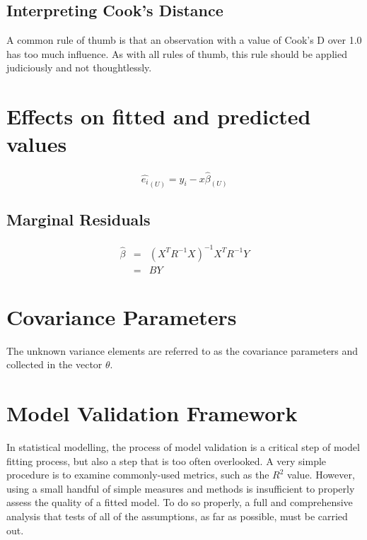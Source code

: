 \documentclass[12pt, a4paper]{article}
\begin{document}
			
			
			

			

			\subsection{Interpreting Cook's Distance}
			A common rule of thumb is that an observation with a value of Cook's D over 1.0 has too much influence. As with all rules of thumb, this rule should be applied judiciously and not thoughtlessly.



			
			
			

			\section{Effects on fitted and predicted values}
			\begin{equation}
			\hat{e_{i}}_{(U)} = y_{i} - x\hat{\beta}_{(U)}
			\end{equation}
			

			
			\subsection{Marginal Residuals}
			\begin{eqnarray}
			\hat{\beta} &=& (X^{T}R^{-1}X)^{-1}X^{T}R^{-1}Y \nonumber \\
			&=& BY \nonumber
			\end{eqnarray}
			
			
			\section{Covariance Parameters} %
			The unknown variance elements are referred to as the covariance parameters and collected in the vector $\theta$.
			

			
			
			\section{Model Validation Framework}
			In statistical modelling, the process of model validation is a critical step of model fitting process, but also a step that is too often overlooked. A very simple procedure is to examine commonly-used
			metrics, such as the $R^2$ value. However, using a small handful of simple measures and methods is insufficient to properly assess the quality of a fitted model. To do so properly, a full and comprehensive
			analysis that tests of all of the assumptions, as far as possible, must be carried out.
			
\end{document}
